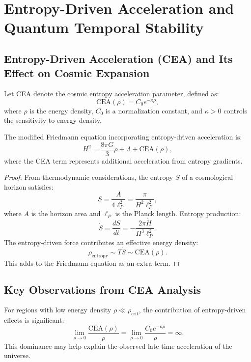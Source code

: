 \section{Entropy-Driven Acceleration and Quantum Temporal Stability}

\subsection{Entropy-Driven Acceleration (CEA) and Its Effect on Cosmic Expansion}

\begin{definition}
Let CEA denote the cosmic entropy acceleration parameter, defined as:
\[
\text{CEA}(\rho) = C_0 e^{-\kappa \rho},
\]
where $\rho$ is the energy density, $C_0$ is a normalization constant, and $\kappa > 0$ controls the sensitivity to energy density.
\end{definition}

\begin{theorem}
The modified Friedmann equation incorporating entropy-driven acceleration is:
\[
H^2 = \frac{8\pi G}{3}\rho + \Lambda + \text{CEA}(\rho),
\]
where the CEA term represents additional acceleration from entropy gradients.
\end{theorem}

\begin{proof}
From thermodynamic considerations, the entropy $S$ of a cosmological horizon satisfies:
\[
S = \frac{A}{4\ell_P^2} = \frac{\pi}{H^2 \ell_P^2},
\]
where $A$ is the horizon area and $\ell_P$ is the Planck length. Entropy production:
\[
\dot{S} = \frac{dS}{dt} = -\frac{2\pi\dot{H}}{H^3\ell_P^2}.
\]
The entropy-driven force contributes an effective energy density:
\[
\rho_{\text{entropy}} \sim T\dot{S} \sim \text{CEA}(\rho).
\]
This adds to the Friedmann equation as an extra term.
\end{proof}

\subsection{Key Observations from CEA Analysis}

\begin{proposition}
For regions with low energy density $\rho \ll \rho_{\text{crit}}$, the contribution of entropy-driven effects is significant:
\[
\lim_{\rho \to 0} \frac{\text{CEA}(\rho)}{\rho} = \lim_{\rho \to 0} \frac{C_0 e^{-\kappa\rho}}{\rho} = \infty.
\]
This dominance may help explain the observed late-time acceleration of the universe.
\end{proposition}

